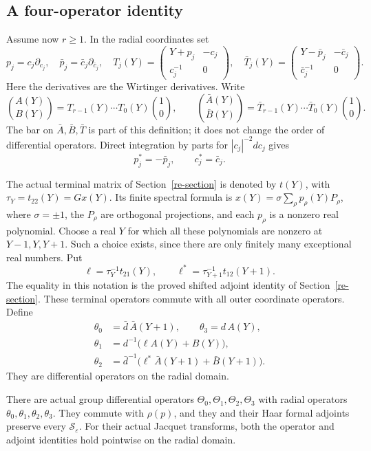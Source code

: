 \subsection{A four-operator identity}

Assume now \(r\geq1\).  In the radial coordinates set
\[
 p_j=c_j\partial_{c_j},\quad
 \bar p_j=\bar c_j\partial_{\bar c_j},\quad
 T_j(Y)=\begin{pmatrix}Y+p_j&-c_j\\c_j^{-1}&0\end{pmatrix},
 \quad
 \bar T_j(Y)=
       \begin{pmatrix}Y-\bar p_j&-\bar c_j\\\bar c_j^{-1}&0\end{pmatrix}.
\]
Here the derivatives are the Wirtinger derivatives.
Write
\[
 \binom{A(Y)}{B(Y)}=T_{r-1}(Y)\cdots T_0(Y)\binom10,
 \qquad
 \binom{\bar A(Y)}{\bar B(Y)}=
                  \bar T_{r-1}(Y)\cdots\bar T_0(Y)\binom10.
\]
The bar on \(\bar A,\bar B,\bar T\) is part of this
definition; it does not change the order of differential
operators.  Direct integration by parts for \(|c_j|^{-2}dc_j\)
gives
\[
                    p_j^*=-\bar p_j,\qquad c_j^*=\bar c_j.
\]

The actual terminal matrix of Section~\ref{re-section} is
denoted by \(t(Y)\), with
\(\tau_Y=t_{22}(Y)=Gx(Y)\).  Its finite spectral formula is
\(x(Y)=\sigma\sum_\rho p_\rho(Y)P_\rho\), where
\(\sigma=\pm1\), the \(P_\rho\) are orthogonal projections,
and each \(p_\rho\) is a nonzero real polynomial.  Choose
a real \(Y\) for which all these polynomials are nonzero
at \(Y-1,Y,Y+1\).  Such a choice exists, since there are
only finitely many exceptional real numbers.  Put
\[
 \ell=\tau_Y^{-1}t_{21}(Y),\qquad
 \ell^*=\tau_{Y+1}^{-1}t_{12}(Y+1).
\]
The equality in this notation is the proved shifted adjoint
identity of Section~\ref{re-section}.  These terminal
operators commute with all outer coordinate operators.
Define
\begin{equation}\label{jf-four-radial}
 \begin{split}
 \theta_0&=\bar d\,\bar A(Y+1),\qquad
 \theta_3=d\,A(Y),\\
 \theta_1&=d^{-1}\bigl(\ell A(Y)+B(Y)\bigr),\\
 \theta_2&=\bar d^{-1}
               \bigl(\ell^*\bar A(Y+1)+\bar B(Y+1)\bigr).
 \end{split}
\end{equation}
They are differential operators on the radial domain.

\begin{proposition}\label{jf-four-lifts}
There are actual group differential operators
\(\Theta_0,\Theta_1,\Theta_2,\Theta_3\) with radial
operators \(\theta_0,\theta_1,\theta_2,\theta_3\).
They commute with \(\rho(p)\), and they and their Haar
formal adjoints preserve every \(\mathscr S_\varepsilon\).
For their actual Jacquet transforms, both the operator and
adjoint identities hold pointwise on the radial domain.
\end{proposition}

